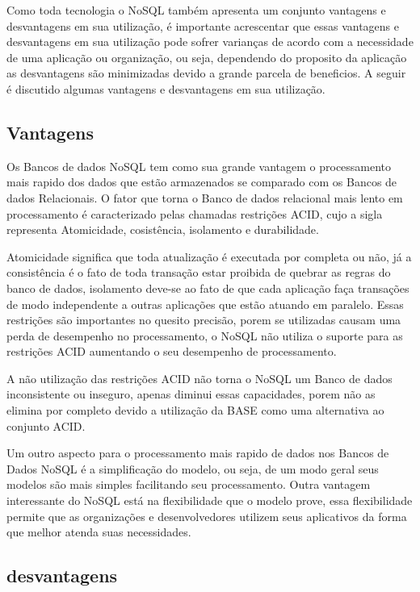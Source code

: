 \documentclass[12pt]{article}
\begin{document}
Como toda tecnologia o NoSQL também apresenta um conjunto vantagens e desvantagens em sua utilização, é importante acrescentar que essas vantagens e desvantagens em sua utilização pode sofrer varianças de acordo com a necessidade de uma aplicação ou organização, ou seja, dependendo do proposito da aplicação as desvantagens são minimizadas devido a grande parcela de beneficios. A seguir é discutido algumas vantagens e desvantagens em sua utilização.

\subsection{Vantagens}
\label{subsec:vantagens}

Os Bancos de dados NoSQL tem como sua grande vantagem o processamento mais rapido dos dados que estão armazenados se comparado com os Bancos de dados Relacionais. O fator que torna o Banco de dados relacional mais lento em processamento é caracterizado pelas chamadas restrições ACID, cujo a sigla representa Atomicidade, cosistência, isolamento e durabilidade. 

Atomicidade significa que toda atualização é executada por completa ou não, já a consistência é o fato de toda transação estar proibida de quebrar as regras do banco de dados, isolamento deve-se ao fato de que cada aplicação faça transações de modo independente a outras aplicações que estão atuando em paralelo. Essas restrições são importantes no quesito precisão, porem se utilizadas causam uma perda de desempenho no processamento, o NoSQL não utiliza o suporte para as restrições ACID aumentando o seu desempenho de processamento. \cite{leavitt:2010}

A não utilização das restrições ACID não torna o NoSQL um Banco de dados inconsistente ou inseguro, apenas diminui essas capacidades, porem não as elimina por completo devido a utilização da BASE como uma alternativa ao conjunto ACID. \cite{pritchett:2008}

Um outro aspecto para o processamento mais rapido de dados nos Bancos de Dados NoSQL é a simplificação do modelo, ou seja, de um modo geral seus modelos são mais simples facilitando seu processamento. Outra vantagem interessante do NoSQL está na flexibilidade que o modelo prove, essa flexibilidade permite que as organizações e desenvolvedores utilizem seus aplicativos da forma que melhor atenda suas necessidades. \cite{leavitt:2010}

\subsection{desvantagens}
\label{subsec:desvantagens}
\end{document}
